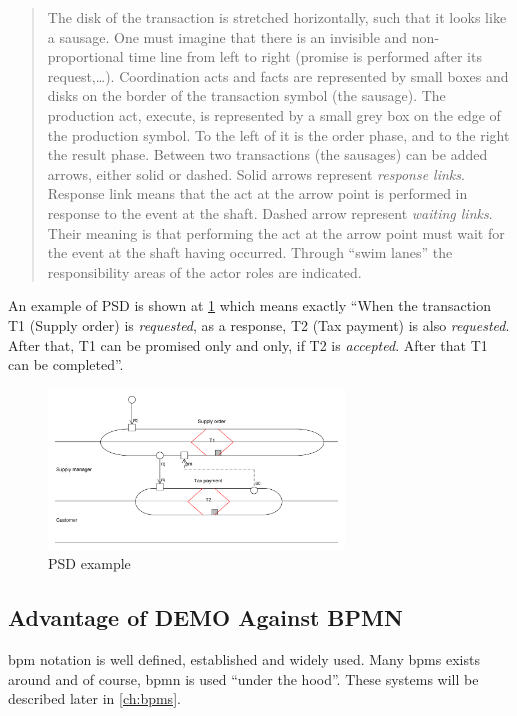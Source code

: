 \begin{quote}
      The disk of the transaction is stretched horizontally, such that it looks like a sausage. One must imagine that there is an invisible and non-proportional time line from left to right (promise is performed after its request,\dots). Coordination acts and facts are represented by small boxes and disks on the border of the transaction symbol (the sausage). 
      The production act, execute, is represented by a small grey box on the edge of the production symbol. To the left of it is the order phase, and to the right the result phase.
      Between two transactions (the sausages) can be added arrows, either solid or dashed. Solid arrows represent \textit{response links}. Response link means that the act at the arrow point is performed in response to the event at the shaft. Dashed arrow represent \textit{waiting links}. Their meaning is that performing the act at the arrow point must wait for the event at the shaft having occurred. Through ``swim lanes'' the responsibility areas of the actor roles are indicated.
\end{quote}
An example of PSD is shown at \cref{fig:psd-example} which means exactly ``When the transaction T1 (Supply order) is \textit{requested}, as a response, T2 (Tax payment) is also \textit{requested}. After that, T1 can be promised only and only, if T2 is \textit{accepted}. After that T1 can be completed''.

\begin{figure}[ht!]
	\centering
    \includegraphics[width=0.7\textwidth]{img/psd-example}
    \caption{PSD example}
    \label{fig:psd-example}
\end{figure}

\subsection{Advantage of DEMO Against BPMN}
    
\gls{bpm} notation is well defined, established and widely used. Many \gls{bpms} exists around and of course, \gls{bpmn} is used ``under the hood''. These systems will be described later in \cref{ch:bpms}.
    
